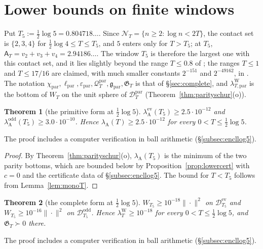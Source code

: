 \documentclass[11pt]{amsart}
\newtheorem{theorem}{Theorem}[section]
\theoremstyle{definition}
\theoremstyle{remark}
\newcommand{\lamW}{\lambda^{\mathrm W}_T}
\newcommand{\lamA}{\lambda_{\mathrm A}(T)}
\newcommand{\NT}{\mathcal N_T}
\newcommand{\Aconst}{\mathsf A_T}
\begin{document}
\section{Lower bounds on finite windows}\label{sec:log5}

Put $T_5:=\frac12\log5=0.804718\ldots$. Since $\NT=\{n\ge2:\log n<2T\}$, the contact set is
$\{2,3,4\}$ for $\frac12\log4\le T\le T_5$, and $5$ enters only for $T>T_5$; at $T_5$,
$\Aconst=v_2+v_3+v_4=2.94186\ldots$. The window $T_5$ is therefore the largest one with this contact set,
and it lies slightly beyond the range $T\le0.8$ of \cite[Thm.~1.2]{Zhu2026}; the ranges $T\le1$ and $T\le17/16$ are claimed, with much
smaller constants $2^{-151}$ and $2^{-49162}$, in \cite[Thms.~A, B]{Liu2026}. The notation
$\chi_{\mathrm{par}},\ell_{\mathrm{par}},\varepsilon_{\mathrm{par}},\mathcal Q^{\mathrm{par}}_T,
\mathfrak g_{\mathrm{par}},\mathfrak G_T$ is that of \S\ref{sec:complete}, and
$\lambda^{\mathrm W}_{T,\mathrm{par}}$ is the bottom of $W_T$ on the unit sphere of
$\mathcal D^{\mathrm{par}}_T$ (Theorem~\ref{thm:parityschur}(o)).

\begin{theorem}[the primitive form at $\frac12\log5$]\label{thm:log5A}
$\lambda^{\mathrm{ev}}_{\mathrm A}(T_5)\ge2.5\cdot10^{-12}$ and
$\lambda^{\mathrm{odd}}_{\mathrm A}(T_5)\ge3.0\cdot10^{-10}$. Hence
$\lamA\ge2.5\cdot10^{-12}$ for every $0<T\le\frac12\log5$.
\end{theorem}

\noindent The proof includes a computer verification in ball arithmetic (\S\ref{subsec:encllog5}).

\begin{proof}
By Theorem~\ref{thm:parityschur}(o), $\lambda_{\mathrm A}(T_5)$ is the minimum of the two
parity bottoms, which are bounded below by Proposition~\ref{prop:lowercert} with $c=0$ and the
certificate data of \S\ref{subsec:encllog5}. The bound for $T<T_5$ follows from
Lemma~\ref{lem:monoT}.
\end{proof}

\begin{theorem}[the complete form at $\frac12\log5$]\label{thm:log5W}
$W_{T_5}\ge10^{-18}\|\cdot\|^2$ on $\mathcal D^{\mathrm{ev}}_{T_5}$ and $W_{T_5}\ge10^{-16}\|\cdot\|^2$ on
$\mathcal D^{\mathrm{odd}}_{T_5}$. Hence $\lamW\ge10^{-18}$ for every $0<T\le\frac12\log5$, and
$\mathfrak G_T\succ0$ there.
\end{theorem}

\noindent The proof includes a computer verification in ball arithmetic (\S\ref{subsec:encllog5}).
\end{document}
